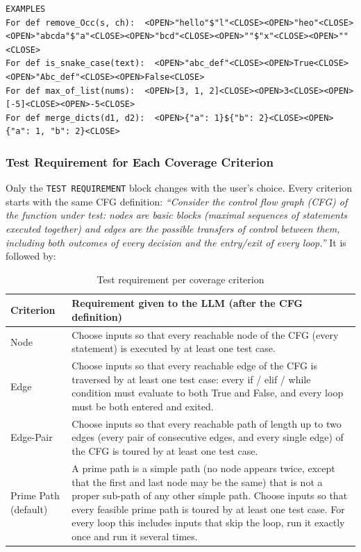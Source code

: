 \documentclass[12pt, a4paper]{article}
\begin{document}
\begin{lstlisting}[style=plain]
EXAMPLES
For def remove_Occ(s, ch):  <OPEN>"hello"$"l"<CLOSE><OPEN>"heo"<CLOSE><OPEN>"abcda"$"a"<CLOSE><OPEN>"bcd"<CLOSE><OPEN>""$"x"<CLOSE><OPEN>""<CLOSE>
For def is_snake_case(text):  <OPEN>"abc_def"<CLOSE><OPEN>True<CLOSE><OPEN>"Abc_def"<CLOSE><OPEN>False<CLOSE>
For def max_of_list(nums):  <OPEN>[3, 1, 2]<CLOSE><OPEN>3<CLOSE><OPEN>[-5]<CLOSE><OPEN>-5<CLOSE>
For def merge_dicts(d1, d2):  <OPEN>{"a": 1}${"b": 2}<CLOSE><OPEN>{"a": 1, "b": 2}<CLOSE>
\end{lstlisting}

\subsubsection{Test Requirement for Each Coverage Criterion}

Only the \texttt{TEST REQUIREMENT} block changes with the user's choice. Every criterion starts with the same CFG definition: \emph{``Consider the control flow graph (CFG) of the function under test: nodes are basic blocks (maximal sequences of statements executed together) and edges are the possible transfers of control between them, including both outcomes of every decision and the entry/exit of every loop.''} It is followed by:

\begin{table}[H]
    \centering
    \small
    \begin{tabular}{lp{11cm}}
        \toprule
        \textbf{Criterion} & \textbf{Requirement given to the LLM (after the CFG definition)} \\
        \midrule
        Node & Choose inputs so that every reachable node of the CFG (every statement) is executed by at least one test case. \\
        \midrule
        Edge & Choose inputs so that every reachable edge of the CFG is traversed by at least one test case: every if / elif / while condition must evaluate to both True and False, and every loop must be both entered and exited. \\
        \midrule
        Edge-Pair & Choose inputs so that every reachable path of length up to two edges (every pair of consecutive edges, and every single edge) of the CFG is toured by at least one test case. \\
        \midrule
        Prime Path (default) & A prime path is a simple path (no node appears twice, except that the first and last node may be the same) that is not a proper sub-path of any other simple path. Choose inputs so that every feasible prime path is toured by at least one test case. For every loop this includes inputs that skip the loop, run it exactly once and run it several times. \\
        \bottomrule
    \end{tabular}
    \caption{Test requirement per coverage criterion}
\end{table}
\end{document}
